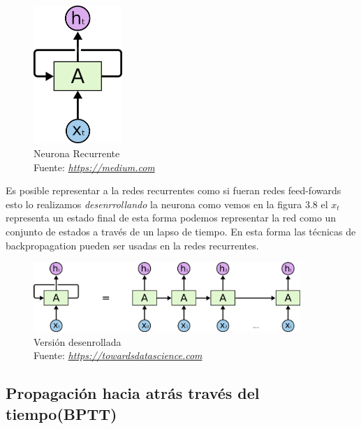 \begin{figure}[H]
	\centering
	\includegraphics[width=0.3\textwidth]{Figures/rnn.png}
	\caption{Neurona Recurrente \\ Fuente:  \href{https://cdn-images-1.medium.com/max/960/1*XB5c4rTCSeFQrK0aFC5IVw.png}{\textit{https://medium.com}}}
	\label{}
\end{figure}

Es posible representar a la redes recurrentes como si fueran redes feed-fowards esto lo realizamos \textit{desenrrollando} la neurona como vemos en la figura 3.8 el $x_{t}$ representa un estado final de esta forma podemos representar la red como un conjunto de estados a través de un lapso de tiempo. En esta forma las técnicas de backpropagation pueden ser usadas en la redes recurrentes.

\begin{figure}[H]
	\centering
	\includegraphics[width=0.9\textwidth]{Figures/rnn2.png}
	\caption{Versión desenrollada \\ Fuente:  \href{https://towardsdatascience.com/introduction-to-recurrent-neural-network-27202c3945f3}{\textit{https://towardsdatascience.com}}}
	\label{}
\end{figure}
\newpage
\subsection{Propagación hacia atrás través del tiempo(BPTT)}

